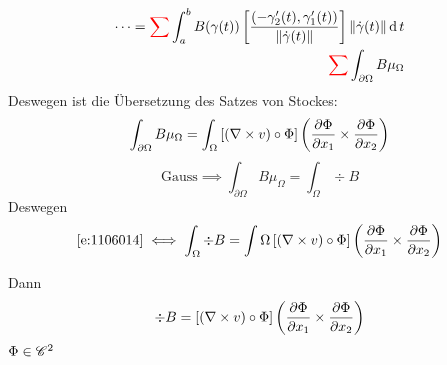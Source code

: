 \begin{Sat}
\begin{eqnarray*}
    \cdots={\color{red}\sum}\int_a^bB(\gamma(t))\left[ \frac{(-\gamma_2'(t),\gamma_1'(t))}{\left\| \dot\gamma(t) \right\|} \right]\left\| \dot\gamma(t) \right\|\operatorname{d} t\\
    {\color{red}\sum}\int_{\partial\Omega}B\mu_\Omega
  \end{eqnarray*}
  Deswegen ist die Übersetzung des Satzes von Stockes:
  \begin{equation}
    \label{e:1106014}
    \int_{\partial\Omega}B\mu_\Omega=\int_\Omega\left[ \left( \nabla\times v \right)\circ\Phi \right]\left( \dfrac{\partial \Phi}{\partial x_1}\times\dfrac{\partial \Phi}{\partial x_2} \right)
  \end{equation}
  \[\text{Gauss}\implies \int_{\partial\Omega}B\mu_\Omega=\int_\Omega\div B\]
  Deswegen
  \[\ref{e:1106014}\iff\int_\Omega\div B=\int\Omega\left[ \left( \nabla\times v \right)\circ \Phi \right]\left( \dfrac{\partial \Phi}{\partial x_1}\times\dfrac{\partial \Phi}{\partial x_2} \right)\]
\end{Sat}
Dann
\[\div B=\left[ (\nabla\times v)\circ\Phi \right]\left( \dfrac{\partial \Phi}{\partial x_1}\times\dfrac{\partial \Phi}{\partial x_2} \right)\]
$\Phi\in\mathscr{C}^2$
